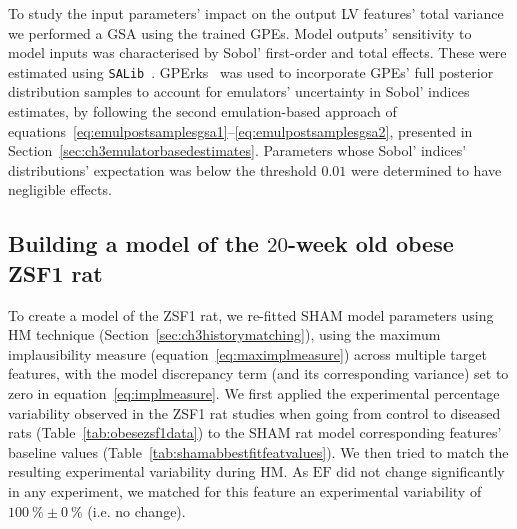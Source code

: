 \vspace{0.2cm}
To study the input parameters' impact on the output LV features' total variance we performed a GSA using the trained GPEs. Model outputs' sensitivity to model inputs was characterised by Sobol' first-order and total effects. These were estimated using \texttt{SALib}~\cite{Herman:2017}. GPErks~\cite{GPErks:2021} was used to incorporate GPEs' full posterior distribution samples to account for emulators' uncertainty in Sobol' indices estimates, by following the second emulation-based approach of equations~\eqref{eq:emulpostsamplesgsa1}--\eqref{eq:emulpostsamplesgsa2}, presented in Section~\ref{sec:ch3emulatorbasedestimates}. Parameters whose Sobol' indices' distributions' expectation was below the threshold $0.01$ were determined to have negligible effects.


%
%
%
\subsection{Building a model of the $20$-week old obese ZSF1 rat}\label{sec:ch7building_a_model_of_the_20_week_old_obese_zsf1_rat}
To create a model of the ZSF1 rat, we re-fitted SHAM model parameters using HM technique (Section~\ref{sec:ch3historymatching}), using the maximum implausibility measure (equation~\eqref{eq:maximplmeasure}) across multiple target features, with the model discrepancy term (and its corresponding variance) set to zero in equation~\eqref{eq:implmeasure}. We first applied the experimental percentage variability observed in the ZSF1 rat studies when going from control to diseased rats (Table~\ref{tab:obesezsf1data}) to the SHAM rat model corresponding features' baseline values (Table~\ref{tab:shamabbestfitfeatvalues}). We then tried to match the resulting experimental variability during HM. As $\textrm{EF}$ did not change significantly in any experiment, we matched for this feature an experimental variability of $\SI{100}{\percent}\pm\SI{0}{\percent}$ (i.e. no change).

